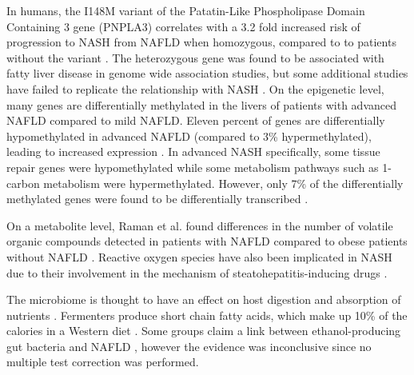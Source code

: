 In humans, the I148M variant of the Patatin-Like Phospholipase Domain Containing 3 gene (PNPLA3) correlates with a 3.2 fold increased risk of progression to NASH from NAFLD when homozygous, compared to to patients without the variant \cite{sookoian2011meta}. The heterozygous gene was found to be associated with fatty liver disease in genome wide association studies, but some additional studies have failed to replicate the relationship with NASH \cite{sookoian2011meta}. On the epigenetic level, many genes are differentially methylated in the livers of patients with advanced NAFLD compared to mild NAFLD. Eleven percent of genes are differentially hypomethylated in advanced NAFLD (compared to 3\% hypermethylated), leading to increased expression \cite{murphy2013relationship}. In advanced NASH specifically, some tissue repair genes were hypomethylated while some metabolism pathways such as 1-carbon metabolism were hypermethylated. However, only 7\% of the differentially methylated genes were found to be differentially transcribed \cite{murphy2013relationship}.

On a metabolite level, Raman et al. found differences in the number of volatile organic compounds detected in patients with NAFLD compared to obese patients without NAFLD \cite{raman2013fecal}. Reactive oxygen species have also been implicated in NASH due to their involvement in the mechanism of steatohepatitis-inducing drugs \cite{berson1998steatohepatitis}.

The microbiome is thought to have an effect on host digestion and absorption of nutrients \cite{gill2006metagenomic}. Fermenters produce short chain fatty acids, which make up 10\% of the calories in a Western diet \cite{mcneil1984contribution}. Some groups claim a link between ethanol-producing gut bacteria and NAFLD \cite{zhu2013characterization} \cite{jiang2015dysbiosis}, however the evidence was inconclusive since no multiple test correction was performed.

